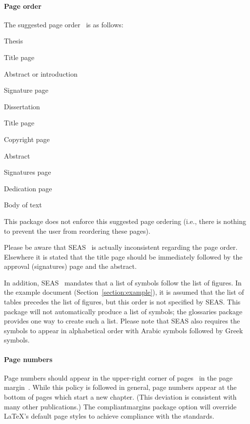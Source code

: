 \documentclass[10pt]{article}
\newcommand{\package}[1]{#1}
\newcommand{\option}[1]{#1}
\begin{document}
\paragraph{Page order}
The suggested page order~\cite{uvaprint:thesis, seas:instructions} is as follows:
\begin{itemize*}
  \item Thesis
  \begin{itemize*}
    \item Title page
    \item Abstract or introduction
    \item Signature page
  \end{itemize*}
  
  \item Dissertation
  \begin{itemize*}
    \item Title page
    \item Copyright page
    \item Abstract
    \item Signatures page
    \item Dedication page
    \item Body of text
  \end{itemize*}
\end{itemize*}
This package does not enforce this suggested page ordering (i.e., there is nothing to prevent the user from reordering these pages).

Please be aware that \gls{SEAS}~\cite{seas:instructions} is actually inconsistent regarding the page order.
Elsewhere it is stated that the title page should be immediately followed by the approval (signatures) page and the abstract.

In addition, \gls{SEAS}~\cite{seas:instructions} mandates that a list of symbols follow the list of figures.
In the example document (Section~\ref{section:example}), it is assumed that the list of tables precedes the list of figures, but this order is not specified by \gls{SEAS}.
This package will not automatically produce a list of symbols; the \package{glossaries} package provides one way to create such a list.
Please note that \gls{SEAS} also requires the symbols to appear in alphabetical order with Arabic symbols followed by Greek symbols.

\paragraph{Page numbers}
Page numbers should appear in the upper-right corner of pages~\cite{uvaprint:thesis} in the page margin~\cite{seas:instructions}.
While this policy is followed in general, page numbers appear at the bottom of pages which start a new chapter.
(This deviation is consistent with many other publications.)
The \option{compliantmargins} package option will override \LaTeX's default page styles to achieve compliance with the standards.
\end{document}
